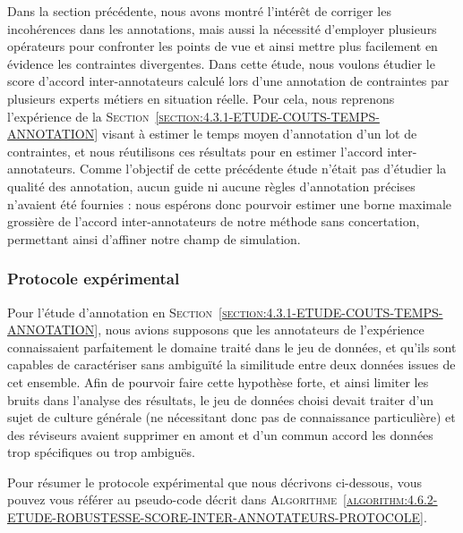 		Dans la section précédente, nous avons montré l'intérêt de corriger les incohérences dans les annotations, mais aussi la nécessité d'employer plusieurs opérateurs pour confronter les points de vue et ainsi mettre plus facilement en évidence les contraintes divergentes.
		Dans cette étude, nous voulons étudier le score d'accord inter-annotateurs calculé lors d'une annotation de contraintes par plusieurs experts métiers en situation réelle.
		Pour cela, nous reprenons l'expérience de la \textsc{Section~\ref{section:4.3.1-ETUDE-COUTS-TEMPS-ANNOTATION}} visant à estimer le temps moyen d'annotation d'un lot de contraintes, et nous réutilisons ces résultats pour en estimer l'accord inter-annotateurs.
		Comme l'objectif de cette précédente étude n'était pas d'étudier la qualité des annotation, aucun guide ni aucune règles d'annotation précises n'avaient été fournies : nous espérons donc pourvoir estimer une borne maximale grossière de l'accord inter-annotateurs de notre méthode sans concertation, permettant ainsi d'affiner notre champ de simulation.
		
		\subsubsection{Protocole expérimental}
			
			\begin{leftBarWarning}
				Pour l'étude d'annotation en \textsc{Section~\ref{section:4.3.1-ETUDE-COUTS-TEMPS-ANNOTATION}}, nous avions supposons que les annotateurs de l'expérience connaissaient parfaitement le domaine traité dans le jeu de données, et qu'ils sont capables de caractériser sans ambiguïté la similitude entre deux données issues de cet ensemble.
				Afin de pourvoir faire cette hypothèse forte, et ainsi limiter les bruits dans l'analyse des résultats, le jeu de données choisi devait traiter d'un sujet de culture générale (ne nécessitant donc pas de connaissance particulière) et des réviseurs avaient supprimer en amont et d'un commun accord les données trop spécifiques ou trop ambiguës.
			\end{leftBarWarning}
			
			Pour résumer le protocole expérimental que nous décrivons ci-dessous, vous pouvez vous référer au pseudo-code décrit dans \textsc{Algorithme~\ref{algorithm:4.6.2-ETUDE-ROBUSTESSE-SCORE-INTER-ANNOTATEURS-PROTOCOLE}}.

